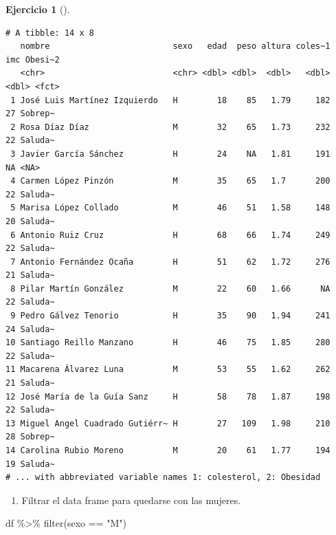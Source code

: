 \documentclass[
  a4paper,
]{scrreport}
\newenvironment{Shaded}{\begin{snugshade}}{\end{snugshade}}
\newcommand{\FunctionTok}[1]{\textcolor[rgb]{0.28,0.35,0.67}{#1}}
\newcommand{\NormalTok}[1]{\textcolor[rgb]{0.00,0.23,0.31}{#1}}
\newcommand{\SpecialCharTok}[1]{\textcolor[rgb]{0.37,0.37,0.37}{#1}}
\newcommand{\StringTok}[1]{\textcolor[rgb]{0.13,0.47,0.30}{#1}}
\providecommand{\tightlist}{%
  \setlength{\itemsep}{0pt}\setlength{\parskip}{0pt}}\usepackage{longtable,booktabs,array}
\theoremstyle{definition}
\newtheorem{exercise}{Ejercicio}[chapter]
\theoremstyle{remark}
\begin{document}
\begin{exercise}[]
\begin{tcolorbox}
\begin{verbatim}
# A tibble: 14 x 8
   nombre                         sexo   edad  peso altura coles~1   imc Obesi~2
   <chr>                          <chr> <dbl> <dbl>  <dbl>   <dbl> <dbl> <fct>  
 1 José Luis Martínez Izquierdo   H        18    85   1.79     182    27 Sobrep~
 2 Rosa Díaz Díaz                 M        32    65   1.73     232    22 Saluda~
 3 Javier García Sánchez          H        24    NA   1.81     191    NA <NA>   
 4 Carmen López Pinzón            M        35    65   1.7      200    22 Saluda~
 5 Marisa López Collado           M        46    51   1.58     148    20 Saluda~
 6 Antonio Ruiz Cruz              H        68    66   1.74     249    22 Saluda~
 7 Antonio Fernández Ocaña        H        51    62   1.72     276    21 Saluda~
 8 Pilar Martín González          M        22    60   1.66      NA    22 Saluda~
 9 Pedro Gálvez Tenorio           H        35    90   1.94     241    24 Saluda~
10 Santiago Reillo Manzano        H        46    75   1.85     280    22 Saluda~
11 Macarena Álvarez Luna          M        53    55   1.62     262    21 Saluda~
12 José María de la Guía Sanz     H        58    78   1.87     198    22 Saluda~
13 Miguel Angel Cuadrado Gutiérr~ H        27   109   1.98     210    28 Sobrep~
14 Carolina Rubio Moreno          M        20    61   1.77     194    19 Saluda~
# ... with abbreviated variable names 1: colesterol, 2: Obesidad
\end{verbatim}

\end{tcolorbox}

\begin{enumerate}
\def\labelenumi{\alph{enumi}.}
\setcounter{enumi}{6}
\tightlist
\item
  Filtrar el data frame para quedarse con las mujeres.
\end{enumerate}

\begin{tcolorbox}[enhanced jigsaw, coltitle=black, breakable, bottomtitle=1mm, colbacktitle=quarto-callout-tip-color!10!white, rightrule=.15mm, opacityback=0, opacitybacktitle=0.6, left=2mm, colframe=quarto-callout-tip-color-frame, title=\textcolor{quarto-callout-tip-color}{\faLightbulb}\hspace{0.5em}{Solución}, toprule=.15mm, toptitle=1mm, arc=.35mm, colback=white, titlerule=0mm, bottomrule=.15mm, leftrule=.75mm]

\begin{Shaded}
\begin{Highlighting}[]
\NormalTok{df }\SpecialCharTok{\%\textgreater{}\%}
    \FunctionTok{filter}\NormalTok{(sexo }\SpecialCharTok{==} \StringTok{"M"}\NormalTok{)}
\end{Highlighting}
\end{Shaded}


\end{tcolorbox}
\end{exercise}
\end{document}
